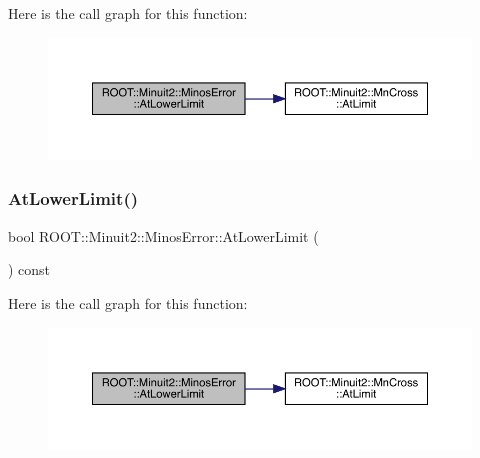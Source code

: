 Here is the call graph for this function\+:
\nopagebreak
\begin{figure}[H]
\begin{center}
\leavevmode
\includegraphics[width=350pt]{d2/dd1/classROOT_1_1Minuit2_1_1MinosError_ab5bac1c70b34e42714730cad95978b51_cgraph}
\end{center}
\end{figure}
\mbox{\label{classROOT_1_1Minuit2_1_1MinosError_ab5bac1c70b34e42714730cad95978b51}} 
\subsubsection{\texorpdfstring{AtLowerLimit()}{AtLowerLimit()}\hspace{0.1cm}{\footnotesize\ttfamily [3/3]}}
{\footnotesize\ttfamily bool R\+O\+O\+T\+::\+Minuit2\+::\+Minos\+Error\+::\+At\+Lower\+Limit (\begin{DoxyParamCaption}{ }\end{DoxyParamCaption}) const\hspace{0.3cm}{\ttfamily [inline]}}

Here is the call graph for this function\+:
\nopagebreak
\begin{figure}[H]
\begin{center}
\leavevmode
\includegraphics[width=350pt]{d2/dd1/classROOT_1_1Minuit2_1_1MinosError_ab5bac1c70b34e42714730cad95978b51_cgraph}
\end{center}
\end{figure}
\mbox{\label{classROOT_1_1Minuit2_1_1MinosError_a6ec22eac3b7dd1a281f1df710ed1dc74}} 

